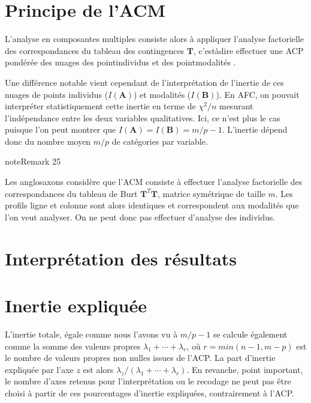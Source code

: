 \documentclass[letterpaper,10pt,french]{sphinxmanual}
\begin{document}
\section{Principe de l’ACM}
\label{\detokenize{acm:principe-de-l-acm}}
\sphinxAtStartPar
L’analyse en composantes multiples consiste alors à appliquer l’analyse factorielle des correspondances  du tableau des  contingences \(\mathbf T\), c’est\sphinxhyphen{}à\sphinxhyphen{}dire effectuer une ACP pondérée des nuages des point\sphinxhyphen{}individus et des point\sphinxhyphen{}modalités .

\sphinxAtStartPar
Une différence notable vient cependant de l’interprétation de l’inertie de ces nuages de points  individus (\(I(\mathbf{A})\)) et modalités (\(I(\mathbf{B})\)). En AFC, on pouvait interpréter statistiquement cette inertie en terme de \(\chi^2/n\) mesurant l’indépendance entre les deux variables qualitatives. Ici, ce n’est plus le cas puisque l’on peut montrer que \(I(\mathbf{A}) = I(\mathbf{B})= m/p-1\). L’inertie dépend donc du nombre moyen \(m/p\) de catégories par variable.
\label{acm:remark-2}
\begin{sphinxadmonition}{note}{Remark 25}



\sphinxAtStartPar
Les anglo\sphinxhyphen{}saxons considère que l’ACM consiste à effectuer l’analyse factorielle des correspondances  du tableau de Burt \(\mathbf T^T \mathbf T\), matrice symétrique de taille \(m\). Les profils ligne et colonne sont alors identiques et correspondent aux modalités que l’on veut analyser. On ne peut donc pas effectuer d’analyse des individus.
\end{sphinxadmonition}


\section{Interprétation des résultats}
\label{\detokenize{acm:interpretation-des-resultats}}

\section{Inertie expliquée}
\label{\detokenize{acm:inertie-expliquee}}
\sphinxAtStartPar
L’inertie totale, égale comme nous l’avons vu à \(m/p-1\) se calcule  également comme la somme des valeurs propres \(\lambda_1+\cdots +\lambda_r\), où \(r=min(n-1,m-p)\) est le nombre de valeurs propres non nulles issues de l’ACP. La part d’inertie expliquée par l’axe \(z\) est alors \(\lambda_z/(\lambda_1+\cdots +\lambda_r)\). En revanche, point important, le nombre d’axes retenus pour l’interprétation ou le recodage ne peut pas être choisi à partir de ces pourcentages d’inertie expliquées, contrairement à l’ACP.
\end{document}
